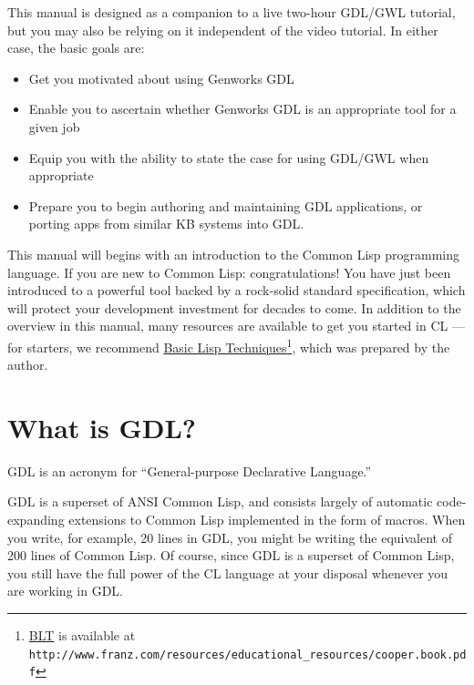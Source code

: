 \documentclass [11pt]{book}
\begin{document}
\label{sec:goalsforthismanual}

This manual is designed as a companion to a live two-hour
GDL/GWL tutorial, but you may also be relying on it independent of the
video tutorial. In either case, the basic goals are:

\begin{itemize}

\item Get you motivated about using Genworks GDL

\item Enable you to ascertain whether Genworks GDL is an appropriate tool for a given job

\item Equip you with the ability to state the case for using GDL/GWL when appropriate

\item Prepare you to begin authoring and maintaining GDL
applications, or porting apps from similar KB systems into GDL.

\end{itemize}

This manual will begins with an introduction to the Common Lisp programming language. If you are new to Common Lisp:
congratulations! You have just been introduced to a powerful tool
backed by a rock-solid standard specification, which will protect your
development investment for decades to come. In addition to the
overview in this manual, many resources are available to get you
started in CL --- for starters, we recommend 
\underline{Basic Lisp Techniques}\footnote{
\underline{BLT} is available at \texttt{http://www.franz.com/resources/educational\_resources/cooper.book.pdf}}, which was prepared by the author. 

\section{What is GDL?}

\label{sec:whatisgdl?}

GDL is an acronym for
``General-purpose Declarative Language.'' 

GDL is a superset of ANSI Common Lisp, and consists largely of
automatic code-expanding extensions to Common Lisp implemented in the
form of macros. When you write, for example, 20 lines in GDL, you
might be writing the equivalent of 200 lines of Common Lisp. Of
course, since GDL is a superset of Common Lisp, you still have the
full power of the CL language at your disposal whenever you are
working in GDL.
\end{document}
